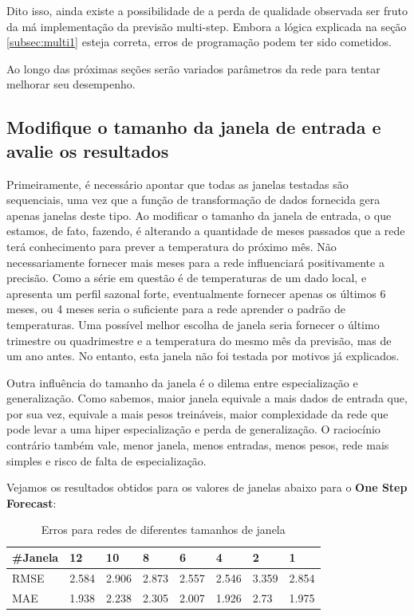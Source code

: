 \documentclass[12pt]{article}
\begin{document}
	Dito isso, ainda existe a possibilidade de a perda de qualidade observada ser fruto da má implementação da previsão multi-step. Embora a lógica explicada na seção \ref{subsec:multi1} esteja correta, erros de programação podem ter sido cometidos. 
	
	Ao longo das próximas seções serão variados parâmetros da rede para tentar melhorar seu desempenho.
	
	
	\subsection{Modifique o tamanho da janela de entrada e avalie os resultados}
	
	Primeiramente, é necessário apontar que todas as janelas testadas são sequenciais, uma vez que a função de transformação de dados fornecida gera apenas janelas deste tipo. Ao modificar o tamanho da janela de entrada, o que estamos, de fato, fazendo, é alterando a quantidade de meses passados que a rede terá conhecimento para prever a temperatura do próximo mês. Não necessariamente fornecer mais meses para a rede influenciará positivamente a precisão. Como a série em questão é de temperaturas de um dado local, e apresenta um perfil sazonal forte, eventualmente fornecer apenas os últimos 6 meses, ou 4 meses seria o suficiente para a rede aprender o padrão de temperaturas. Uma possível melhor escolha de janela seria fornecer o último trimestre ou quadrimestre e a temperatura do mesmo mês da previsão, mas de um ano antes. No entanto, esta janela não foi testada por motivos já explicados.
	
	Outra influência do tamanho da janela é o dilema entre especialização e generalização. Como sabemos, maior janela equivale a mais dados de entrada que, por sua vez, equivale a mais pesos treináveis, maior complexidade da rede que pode levar a uma hiper especialização e perda de generalização. O raciocínio contrário também vale, menor janela, menos entradas, menos pesos, rede mais simples e risco de falta de especialização.
	
	Vejamos os resultados obtidos para os valores de janelas abaixo para o \textbf{One Step Forecast}:
	
	\begin{table}[H]
		\centering
		\begin{tabular}{|l|l|l|l|l|l|l|l|}
			
			\hline
			\#Janela & 12    & 10    & 8     & 6     & 4     & 2     & 1     \\ \hline
			RMSE     & 2.584 & 2.906 & 2.873 & 2.557 & 2.546 & 3.359 & 2.854 \\ \hline
			MAE      & 1.938 & 2.238 & 2.305 & 2.007 & 1.926 & 2.73  & 1.975 \\ \hline
		\end{tabular}
		\caption{Erros para redes de diferentes tamanhos de janela}
	\end{table}
\end{document}
